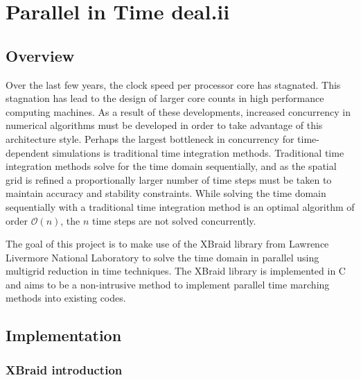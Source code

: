 \documentclass{article}
\begin{document}
\section{Parallel in Time deal.ii}\label{parallel-in-time-deal.ii}

\subsection{Overview}\label{overview}

Over the last few years, the clock speed per processor core has
stagnated. This stagnation has lead to the design of larger core counts
in high performance computing machines. As a result of these
developments, increased concurrency in numerical algorithms must be
developed in order to take advantage of this architecture style. Perhaps
the largest bottleneck in concurrency for time-dependent simulations is
traditional time integration methods. Traditional time integration
methods solve for the time domain sequentially, and as the spatial grid
is refined a proportionally larger number of time steps must be taken to
maintain accuracy and stability constraints. While solving the time
domain sequentially with a traditional time integration method is an
optimal algorithm of order \(\mathcal{O}(n)\), the \(n\) time steps are
not solved concurrently.

The goal of this project is to make use of the XBraid library from
Lawrence Livermore National Laboratory to solve the time domain in
parallel using multigrid reduction in time techniques. The XBraid
library is implemented in C and aims to be a non-intrusive method to
implement parallel time marching methods into existing codes.

\subsection{Implementation}\label{implementation}

\subsubsection{XBraid introduction}\label{xbraid-introduction}
\end{document}
